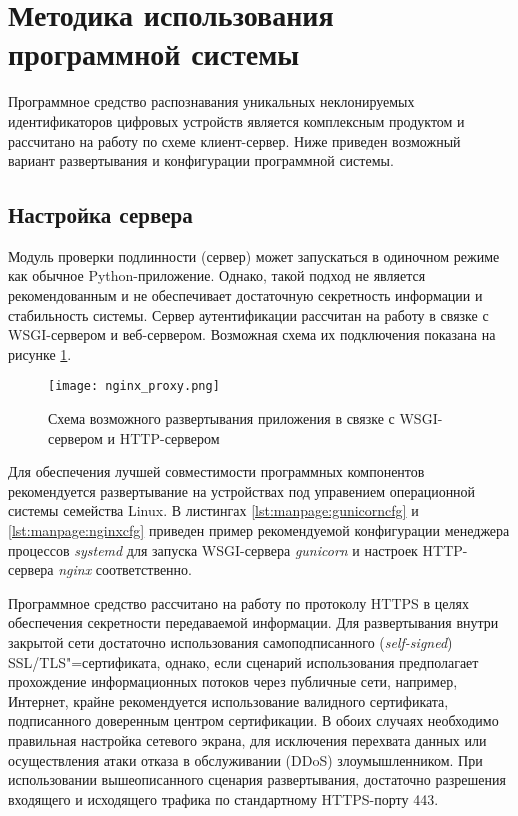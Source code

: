 \section{Методика использования программной системы}
\label{sec:manpage}

Программное средство распознавания уникальных неклонируемых идентификаторов цифровых устройств является комплексным продуктом и рассчитано на работу по схеме клиент-сервер. Ниже приведен возможный вариант развертывания и конфигурации программной системы.

\subsection{Настройка сервера}
\label{sec:manpage:server_setup}
Модуль проверки подлинности (сервер) может запускаться в одиночном режиме как обычное Python-приложение. Однако, такой подход не является рекомендованным и не обеспечивает достаточную секретность информации и стабильность системы. Сервер аутентификации рассчитан на работу в связке с WSGI-сервером и веб-сервером. Возможная схема их подключения показана на рисунке \ref{fig:manpage:nginx_proxy}.

\begin{figure}[ht]
    \centering
    \texttt{[image: nginx\_proxy.png]}
    \caption{Схема возможного развертывания приложения в связке с WSGI-сервером и HTTP-сервером}
    \label{fig:manpage:nginx_proxy}
\end{figure}


Для обеспечения лучшей совместимости программных компонентов рекомендуется развертывание на устройствах под управением операционной системы семейства Linux. В листингах \ref{lst:manpage:gunicorncfg} и \ref{lst:manpage:nginxcfg} приведен пример рекомендуемой конфигурации менеджера процессов \emph{systemd} для запуска WSGI-сервера \emph{gunicorn} и настроек HTTP-сервера \emph{nginx} соответственно.


Программное средство рассчитано на работу по протоколу HTTPS в целях обеспечения секретности передаваемой информации. Для развертывания внутри закрытой сети достаточно использования самоподписанного (\emph{self-signed}) SSL/TLS"=сертификата, однако, если сценарий использования предполагает прохождение информационных потоков через публичные сети, например, Интернет, крайне рекомендуется использование валидного сертификата, подписанного доверенным центром сертификации. В обоих случаях необходимо правильная настройка сетевого экрана, для исключения перехвата данных или осуществления атаки отказа в обслуживании (DDoS) злоумышленником. При использовании вышеописанного сценария развертывания, достаточно разрешения входящего и исходящего трафика по стандартному HTTPS-порту 443.

